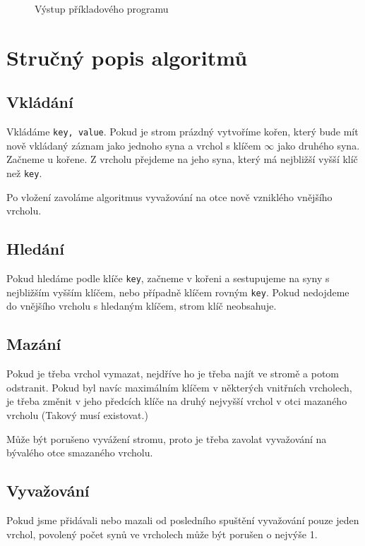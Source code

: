 \documentclass[a4paper,11pt,openany]{article}
\begin{document}
\begin{figure}

\caption{Výstup příkladového programu}
\label{output}
\end{figure}

\section{Stručný popis algoritmů}
	
\subsection{Vkládání}
	
Vkládáme \texttt{key, value}.  Pokud  je  strom  prázdný  vytvoříme  kořen,  který  bude  mít  nově  vkládaný záznam jako jednoho syna a vrchol s klíčem $\infty$ jako druhého syna. Začneme u kořene. Z vrcholu přejdeme na jeho syna, který má nejbližší vyšší klíč než \texttt{key}.

Po vložení zavoláme algoritmus vyvažování na otce nově vzniklého vnějšího vrcholu.
	
\subsection{Hledání}

Pokud hledáme podle klíče \texttt{key}, začneme v kořeni a sestupujeme na syny s nejbližším vyšším klíčem, nebo případně klíčem rovným \texttt{key}. Pokud nedojdeme do vnějšího vrcholu s hledaným klíčem, strom klíč neobsahuje.

\subsection{Mazání}

Pokud je třeba vrchol vymazat, nejdříve ho je třeba najít ve stromě a potom odstranit. Pokud byl navíc maximálním klíčem v některých vnitřních vrcholech, je třeba změnit v jeho předcích klíče na druhý nejvyšší vrchol v otci mazaného vrcholu (Takový musí existovat.)

Může být porušeno vyvážení stromu, proto je třeba zavolat vyvažování na bývalého otce smazaného vrcholu.
	
\subsection{Vyvažování}

Pokud jsme přidávali nebo mazali od posledního spuštění vyvažování pouze jeden vrchol, povolený počet synů ve vrcholech může být porušen o nejvýše 1.
\end{document}
